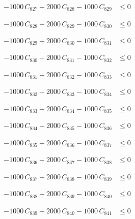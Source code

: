 \documentclass[a4paper,11pt]{article}
\begin{document}
\begin{align}
-1000\,C_{827} + 2000\,C_{828} - 1000\,C_{829} &\leq 0 \nonumber
\end{align}

\begin{align}
-1000\,C_{828} + 2000\,C_{829} - 1000\,C_{830} &\leq 0 \nonumber
\end{align}

\begin{align}
-1000\,C_{829} + 2000\,C_{830} - 1000\,C_{831} &\leq 0 \nonumber
\end{align}

\begin{align}
-1000\,C_{830} + 2000\,C_{831} - 1000\,C_{832} &\leq 0 \nonumber
\end{align}

\begin{align}
-1000\,C_{831} + 2000\,C_{832} - 1000\,C_{833} &\leq 0 \nonumber
\end{align}

\begin{align}
-1000\,C_{832} + 2000\,C_{833} - 1000\,C_{834} &\leq 0 \nonumber
\end{align}

\begin{align}
-1000\,C_{833} + 2000\,C_{834} - 1000\,C_{835} &\leq 0 \nonumber
\end{align}

\begin{align}
-1000\,C_{834} + 2000\,C_{835} - 1000\,C_{836} &\leq 0 \nonumber
\end{align}

\begin{align}
-1000\,C_{835} + 2000\,C_{836} - 1000\,C_{837} &\leq 0 \nonumber
\end{align}

\begin{align}
-1000\,C_{836} + 2000\,C_{837} - 1000\,C_{838} &\leq 0 \nonumber
\end{align}

\begin{align}
-1000\,C_{837} + 2000\,C_{838} - 1000\,C_{839} &\leq 0 \nonumber
\end{align}

\begin{align}
-1000\,C_{838} + 2000\,C_{839} - 1000\,C_{840} &\leq 0 \nonumber
\end{align}

\begin{align}
-1000\,C_{839} + 2000\,C_{840} - 1000\,C_{841} &\leq 0 \nonumber
\end{align}
\end{document}
